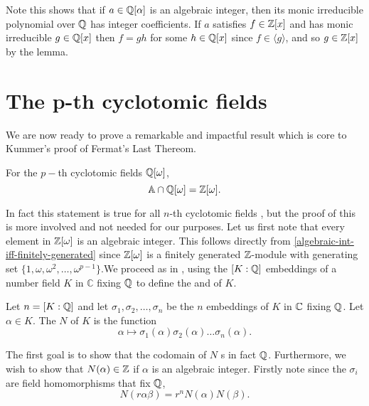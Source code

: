 \begin{remark}\label{algebraic-integer-irreducible-poly-has-integer-coefficients}
Note this shows that if $a\in \mathbb{Q}[\alpha]$ is an algebraic integer, then its monic irreducible polynomial over $\mathbb{Q}$ has integer coefficients. If $a$ satisfies $f\in \mathbb{Z}[x]$ and has monic irreducible $g\in \mathbb{Q}[x]$ then $f=gh$ for some $h\in \mathbb{Q}[x]$ since $f\in \langle g \rangle$, and so $g\in \mathbb{Z}[x]$ by the lemma.
\end{remark}

\section{The p-th cyclotomic fields}
We are now ready to prove a remarkable and impactful result which is core to Kummer's proof of Fermat's Last Thereom.
\begin{theorem}\label{algebriac-integers-are-Z[w]}
For the $p-$th cyclotomic fields $\mathbb{Q}[\omega]$,
$$\mathbb{A}\cap\mathbb{Q}[\omega]= \mathbb{Z}[\omega].$$
\end{theorem}
In fact this statement is true for all $n$-th cyclotomic fields \cite{NumberFields}, but the proof of this is more involved and not needed for our purposes. Let us first note that every element in $\mathbb{Z}[\omega]$ is an algebraic integer. This follows directly from \cref{algebraic-int-iff-finitely-generated} since $\mathbb{Z}[\omega]$ is a finitely generated $\mathbb{Z}$-module with generating set $\{1,\omega,\omega^2,\dots,\omega^{p-1}\}$.We proceed as in \cite{NumberFields}, using the $[K:\mathbb{Q}]$ embeddings of a number field $K$ in $\mathbb{C}$ fixing $\mathbb{Q}$ to define the  and  of $K$. 

\begin{definition}
Let $n=[K:\mathbb{Q}]$ and let $\sigma_1,\sigma_2,\dots,\sigma_n$ be the $n$ embeddings of $K$ in $\mathbb{C}$ fixing $\mathbb{Q}$. Let $\alpha\in K$. %
The  $N$ of $K$ is the function
$$\alpha\mapsto\sigma_1(\alpha)\sigma_2(\alpha)\dots \sigma_n(\alpha).$$
\end{definition}

The first goal is to show that the codomain of $N$ s in fact $\mathbb{Q}$. Furthermore, we wish to show that  $N(\alpha)\in \mathbb{Z}$ if $\alpha$ is an algebraic integer. Firstly note since the $\sigma_i$ are field homomorphisms that fix $\mathbb{Q}$, $$N(r\alpha\beta)=r^nN(\alpha)N(\beta).$$


